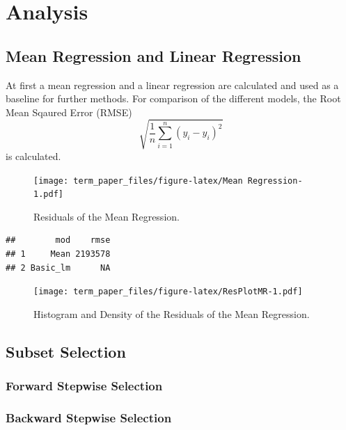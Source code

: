 \documentclass[11pt,]{article}
\begin{document}
\hypertarget{analysis}{%
\section{Analysis}\label{analysis}}

\hypertarget{mean-regression-and-linear-regression}{%
\subsection{Mean Regression and Linear
Regression}\label{mean-regression-and-linear-regression}}

At first a mean regression and a linear regression are calculated and
used as a baseline for further methods. For comparison of the different
models, the Root Mean Sqaured Error (RMSE)
\[\sqrt{\frac{1}{n}\sum_{i = 1}^{n}\left(y_i-\hat{y}_i\right)^2}\] is
calculated.

\begin{figure}
\centering
\texttt{[image: term\_paper\_files/figure-latex/Mean Regression-1.pdf]}
\caption{Residuals of the Mean Regression.}
\end{figure}

\begin{verbatim}
##        mod    rmse
## 1     Mean 2193578
## 2 Basic_lm      NA
\end{verbatim}

\begin{figure}
\centering
\texttt{[image: term\_paper\_files/figure-latex/ResPlotMR-1.pdf]}
\caption{Histogram and Density of the Residuals of the Mean Regression.}
\end{figure}

\hypertarget{subset-selection}{%
\subsection{Subset Selection}\label{subset-selection}}

\hypertarget{forward-stepwise-selection}{%
\subsubsection{Forward Stepwise
Selection}\label{forward-stepwise-selection}}

\hypertarget{backward-stepwise-selection}{%
\subsubsection{Backward Stepwise
Selection}\label{backward-stepwise-selection}}
\end{document}
